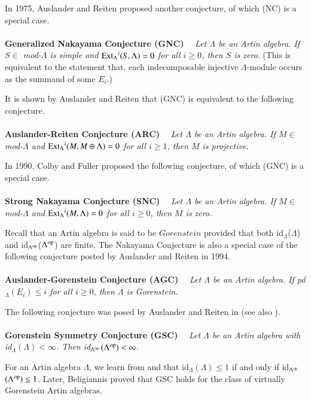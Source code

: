 \documentclass[11pt,a4paper]{article}
\begin{document}
In 1975, Auslander and Reiten \cite{ar0}  proposed   another conjecture, of which (NC)
is a special case.
 \\
\\
{\bf Generalized Nakayama Conjecture (GNC)  }\ \ {\it  Let   $\Lambda$  be    an Artin algebra.
 If $S \in$  {\rm mod}-$\Lambda$  is simple and  ${\rm Ext_{\Lambda}}^{i}(S, \Lambda)=0$ for all  $i \geq 0$, then $S$ is zero}. {\rm(This is equivalent to the statement that,
 each indecomposable injective $\Lambda$-module occurs as the summand of some $E_{i}$.)}
\\
\par
It is shown by Auslander and Reiten \cite{ar0} that  (GNC)  is equivalent to
the following conjecture.
 \\
\\
{\bf Auslander-Reiten  Conjecture (ARC) }\ \ {\it  Let   $\Lambda$  be    an Artin algebra.
 If $M \in$  {\rm mod}-$\Lambda$   and  ${\rm Ext_{\Lambda}}^{i}(M, M\oplus\Lambda)=0$ for all  $i \geq 1$, then $M$ is projective.}
\\
\par
In 1990, Colby and Fuller \cite{cof}  proposed   the following conjecture, of which (GNC)
is a special case.
\\
\\
{\bf Strong Nakayama Conjecture (SNC)  }\ \ {\it  Let   $\Lambda$  be    an Artin algebra.
 If $M \in$  {\rm mod}-$\Lambda$    and  ${\rm Ext_{\Lambda}}^{i}(M, \Lambda)=0$ for all  $i \geq 0$, then $M$ is zero.}
\\
\par
Recall that an  Artin algebra is said to be  $Gorenstein$ provided that both {\rm id}$_{\Lambda}$($\Lambda$)
 and {\rm id}$_{\Lambda^{{\rm op}}}$($\Lambda^{{\rm op}}$) are finite. The Nakayama Conjecture is also   a special case  of the following conjecture posted by  Auslander and Reiten \cite{ar2} in 1994.
\\
\\
{\bf Auslander-Gorenstein Conjecture (AGC)  }\ \ {\it  Let   $\Lambda$  be    an Artin algebra. If    {\rm pd}$_{\Lambda}$$(E_{i}) \leq i$ for all $i \geq 0$, then  $\Lambda$ is  Gorenstein.}
\\
\par
The following   conjecture was posed by  Auslander and Reiten in \cite[p. 150]{ar1} (see also \cite[Conjecture (13)]{ars}).
\\
\\
{\bf Gorenstein Symmetry Conjecture (GSC) }\ \ {\it  Let   $\Lambda$  be    an Artin algebra   with {\rm id}$_{\Lambda}$$(\Lambda) < \infty$. Then {\rm id}$_{\Lambda^{{\rm op}}}$$(\Lambda^{{\rm op}}) < \infty$}.
\\
\par
For an Artin algebra $\Lambda$,   we learn from \cite[p. 121]{ar1}  and  \cite[Corollary 2]{hua} that {\rm id}$_{\Lambda}$$(\Lambda) \leq 1$ if and only if {\rm id}$_{\Lambda^{{\rm op}}}$$(\Lambda^{{\rm op}}) \leq 1$.
Later, Beligiannis \cite[Theorem 11.4]{bel}  proved that GSC holds for the class of  virtually Gorenstein Artin  algebras.
\end{document}
